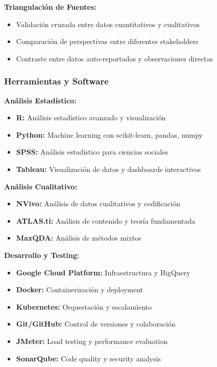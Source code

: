 \textbf{Triangulación de Fuentes:}
\begin{itemize}
    \item Validación cruzada entre datos cuantitativos y cualitativos
    \item Comparación de perspectivas entre diferentes stakeholders
    \item Contraste entre datos auto-reportados y observaciones directas
\end{itemize}

\subsubsection{Herramientas y Software}

\textbf{Análisis Estadístico:}
\begin{itemize}
    \item \textbf{R:} Análisis estadístico avanzado y visualización
    \item \textbf{Python:} Machine learning con scikit-learn, pandas, numpy
    \item \textbf{SPSS:} Análisis estadístico para ciencias sociales
    \item \textbf{Tableau:} Visualización de datos y dashboards interactivos
\end{itemize}

\textbf{Análisis Cualitativo:}
\begin{itemize}
    \item \textbf{NVivo:} Análisis de datos cualitativos y codificación
    \item \textbf{ATLAS.ti:} Análisis de contenido y teoría fundamentada
    \item \textbf{MaxQDA:} Análisis de métodos mixtos
\end{itemize}

\textbf{Desarrollo y Testing:}
\begin{itemize}
    \item \textbf{Google Cloud Platform:} Infraestructura y BigQuery
    \item \textbf{Docker:} Containerización y deployment
    \item \textbf{Kubernetes:} Orquestación y escalamiento
    \item \textbf{Git/GitHub:} Control de versiones y colaboración
    \item \textbf{JMeter:} Load testing y performance evaluation
    \item \textbf{SonarQube:} Code quality y security analysis
\end{itemize}


